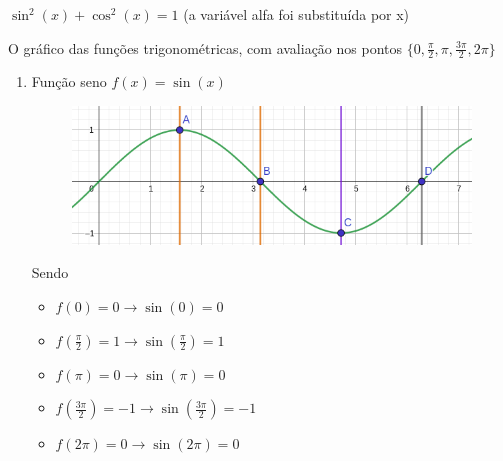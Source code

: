 \begin{multicols*}{2}
    $\sin^2(x) + \cos^2(x) = 1$ (a variável alfa foi substituída por x)

    O gráfico das funções trigonométricas, com avaliação nos pontos
    $\Big\{ 0, \frac{\pi}{2}, \pi, \frac{3 \pi}{2}, 2 \pi \Big\}$

    \begin{enumerate}[wide, labelwidth=!, labelindent=0pt]
        \item Função seno $f(x) = \sin(x)$
              \begin{figure}[H]
                  \centering
                  \includegraphics[scale=0.3]{assets/rafael/img33.png}
              \end{figure}
              Sendo
              \begin{itemize}
                  \item $f(0) = 0 \rightarrow \sin(0) = 0 $
                  \item $f\left(\frac{\pi}{2} \right) = 1 \rightarrow \sin \left( \frac{\pi}{2} \right) = 1 $
                  \item $f(\pi) = 0 \rightarrow \sin(\pi) = 0$
                  \item $f\left( \frac{3 \pi}{2} \right) = -1 \rightarrow \sin \left( \frac{3 \pi}{2}\right) = -1$
                  \item $f(2 \pi) = 0 \rightarrow \sin(2 \pi) = 0$
              \end{itemize}


\end{enumerate}
\end{multicols*}
